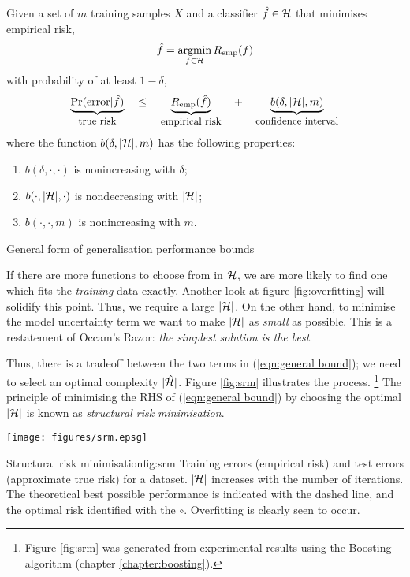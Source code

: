 \begin{linefigure}
Given a set of $m$ training samples $X$ and a classifier $\hat{f} \in \mathcal{H}$
that minimises empirical risk,
\begin{equation*}
\hat{f} = \argmin_{f \in
\calH} R_{\emp}(f)
\end{equation*}
with probability of at least $1 - \delta$,
%
\begin{equation}
\underbrace{\Pr(\mathrm{error}|\hat{f})}_{\mbox{\small{true risk}}}
\quad \leq \quad
\underbrace{R_{\mathrm{emp}}(\hat{f})}_{\mbox{\small{empirical risk}}}
\quad + \quad
\underbrace{b(\delta, |\mathcal{H}|, m)}_{\mbox{\small{confidence interval}}}
\label{eqn:general bound}
\end{equation}
%
where the function $b(\delta, |\mathcal{H}|, m)$ has the following
properties:
\begin{enumerate}
\item	$b(\delta, \cdot, \cdot)$ is nonincreasing with $\delta$;
\item	$b(\cdot, |\mathcal{H}|, \cdot)$ is nondecreasing with $|\mathcal{H}|$;
\item	$b(\cdot, \cdot, m)$ is nonincreasing with $m$.
\end{enumerate}
\caption{General form of generalisation performance bounds}
\label{fig:generalisation bound form}
\end{linefigure}

If there are more functions to choose from in $\mathcal{H}$, we
are more likely to find one which fits the \emph{training} data
exactly.  Another look at figure \ref{fig:overfitting} will solidify
this point.  Thus, we require a large $|\mathcal{H}|$.  On the other hand,
to minimise the model uncertainty term we want to make $|\mathcal{H}|$ as
\emph{small} as possible.  This is a restatement of Occam's Razor: \emph{the simplest solution is the best}.

Thus, there is a tradeoff between the two terms in (\ref{eqn:general
bound}); we need to select an optimal complexity $|\hat{\mathcal{H}}|$.
Figure \ref{fig:srm} illustrates the process.
\footnote{Figure \ref{fig:srm} was generated from experimental results
using the Boosting algorithm (chapter \ref{chapter:boosting}).}
The principle of minimising the RHS of (\ref{eqn:general bound}) by
choosing the optimal $|\mathcal{H}|$ is known as \emph{structural risk
minimisation}.

\begin{linefigure}
\begin{center}
\texttt{[image: figures/srm.epsg]}
\end{center}
\begin{capt}{Structural risk minimisation}{fig:srm}
Training errors (empirical risk) and test errors (approximate true
risk) for a dataset.  $|\mathcal{H}|$ increases with the number of
iterations.  The theoretical best possible performance is
indicated with the dashed line, and the optimal risk identified with
the $\circ$.  Overfitting is clearly seen to occur.
\end{capt}
\end{linefigure}


